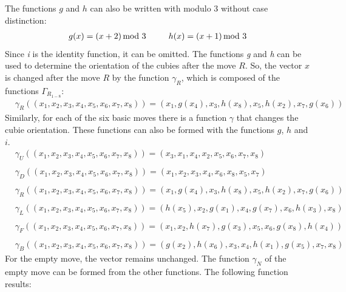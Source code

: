 \documentclass[12pt,a4paper]{article}
\theoremstyle{custom}
\begin{document}
The functions $g$ and $h$ can also be written with modulo 3 without case distinction:
\begin{align*}
g(x)=(x+2) \hspace*{-0.5em} \mod 3 \ \ \ \ \ \ \ \ h(x) = (x+1) \hspace*{-0.5em} \mod 3
\end{align*}
Since \textit{i} is the identity function, it can be omitted.
The functions \textit{g} and \textit{h} can be used to determine the orientation of the cubies after the move $R$.  So,  the vector $x$ is changed after the move $R$ by the function $\gamma_R$, which is composed of the functions $\Gamma_{R_{1-8}}$:
\begin{align*}
& \gamma_R \left( (x_1, x_2, x_3, x_4, x_5, x_6, x_7, x_8  ) \right) =  \left( x_1, g(x_4), x_3, h(x_8), x_5, h(x_2), x_7, g(x_6) \right)
\end{align*}
Similarly, for each of the six basic moves there is a function $\gamma$ that changes the cubie orientation. These functions can also be formed with the functions $g$, $h$ and $i$.
\begin{align*}
& \gamma_U \left( (x_1, x_2, x_3, x_4, x_5, x_6, x_7, x_8  ) \right) =  \left( x_3, x_1, x_4, x_2, x_5, x_6, x_7, x_8 \right) \\
\\ 
& \gamma_D \left( (x_1, x_2, x_3, x_4, x_5, x_6, x_7, x_8  ) \right)  =  \left( x_1, x_2, x_3, x_4, x_6, x_8, x_5, x_7 \right) \\
\\
& \gamma_R \left( (x_1, x_2, x_3, x_4, x_5, x_6, x_7, x_8  ) \right)  =  \left( x_1, g(x_4), x_3, h(x_8), x_5, h(x_2), x_7, g(x_6) \right) \\ 
\\
& \gamma_L \left( (x_1, x_2, x_3, x_4, x_5, x_6, x_7, x_8  ) \right)  =   (h(x_5), x_2, g(x_1), x_4, g(x_7), x_6, h(x_3), x_8) \\ 
\\
& \gamma_F \left( (x_1, x_2, x_3, x_4, x_5, x_6, x_7, x_8  ) \right)  =  \left( x_1, x_2, h(x_7), g(x_3), x_5, x_6, g(x_8), h(x_4) \right) \\
\\
& \gamma_B \left( (x_1, x_2, x_3, x_4, x_5, x_6, x_7, x_8  ) \right)  =  \left( g(x_2), h(x_6), x_3, x_4, h(x_1), g(x_5), x_7, x_8 \right)
\end{align*}
For the empty move,  the vector remains unchanged. The function $\gamma_N$ of the empty move can be formed from the other functions. The following function results:
\end{document}
